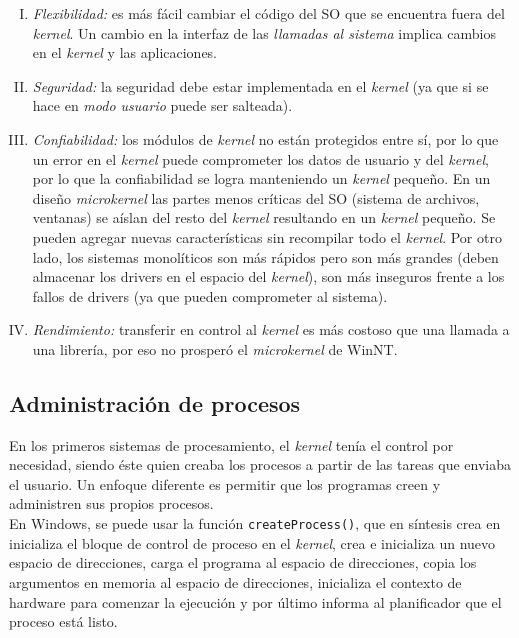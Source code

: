 \documentclass[a4paper,10pt,spanish]{article}
\begin{document}
\begin{enumerate}[I.]
\item \textit{Flexibilidad:} es más fácil cambiar el código del SO que se encuentra fuera del \textit{kernel}. Un cambio en la interfaz de las \textit{llamadas al sistema} implica cambios en el \textit{kernel} y las aplicaciones.

\item \textit{Seguridad:} la seguridad debe estar implementada en el \textit{kernel} (ya que si se hace en \textit{modo usuario} puede ser salteada).

\item \textit{Confiabilidad:} los módulos de \textit{kernel} no están protegidos entre sí, por lo que un error en el \textit{kernel} puede comprometer los datos de usuario y del \textit{kernel}, por lo que la confiabilidad se logra manteniendo un \textit{kernel} pequeño. En un diseño \textit{microkernel} las partes menos críticas del SO (sistema de archivos, ventanas) se aíslan del resto del \textit{kernel} resultando en un \textit{kernel} pequeño. Se pueden agregar nuevas características sin recompilar todo el \textit{kernel}. Por otro lado, los sistemas monolíticos son más rápidos pero son más grandes (deben almacenar los drivers en el espacio del \textit{kernel}), son más inseguros frente a los fallos de drivers (ya que pueden comprometer al sistema).

\item \textit{Rendimiento:} transferir en control al \textit{kernel} es más costoso que una llamada a una librería, por eso no prosperó el \textit{microkernel} de WinNT.
\end{enumerate}

\subsection{Administración de procesos}

En los primeros sistemas de procesamiento, el \textit{kernel} tenía el control por necesidad, siendo éste quien creaba los procesos a partir de las tareas que enviaba el usuario. Un enfoque diferente es permitir que los programas creen y administren sus propios procesos. \\

En Windows, se puede usar la función \texttt{createProcess()}, que en síntesis crea en inicializa el bloque de control de proceso en el \textit{kernel}, crea e inicializa un nuevo espacio de direcciones, carga el programa al espacio de direcciones, copia los argumentos en memoria al espacio de direcciones, inicializa el contexto de hardware para comenzar la ejecución y por último informa al planificador que el proceso está listo.
\end{document}
